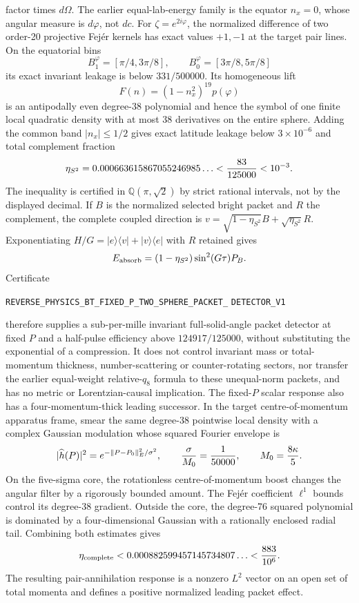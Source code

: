 \documentclass[11pt]{article}
\theoremstyle{definition}
\theoremstyle{remark}
\begin{document}
factor times $d\Omega$.  The earlier equal-lab-energy family is the equator
$n_x=0$, whose angular measure is $d\varphi$, not $dc$.  For
$\zeta=e^{2i\varphi}$, the normalized difference of two order-20 projective
Fej\'er kernels has exact values $+1,-1$ at the target pair lines.  On the
equatorial bins
\[
 B_1^\varphi=[\pi/4,3\pi/8],\qquad
 B_0^\varphi=[3\pi/8,5\pi/8]
\]
its exact invariant leakage is below $331/500000$.  Its homogeneous lift
\[
 F(n)=(1-n_x^2)^{19}p(\varphi)
\]
is an antipodally even degree-38 polynomial and hence the symbol of one finite
local quadratic density with at most 38 derivatives on the entire sphere.
Adding the common band $|n_x|\leq1/2$ gives exact latitude leakage below
$3\times10^{-6}$ and total complement fraction
\[
 \eta_{S^2}=0.000663615867055246985\ldots
 <{83\over125000}<10^{-3}.
\]
The inequality is certified in $\mathbb Q(\pi,\sqrt2)$ by strict rational
intervals, not by the displayed decimal.
If $B$ is the normalized selected bright packet and $R$ the complement, the
complete coupled direction is
$v=\sqrt{1-\eta_{S^2}}B+\sqrt{\eta_{S^2}}R$.  Exponentiating
$H/G=|e\rangle\langle v|+|v\rangle\langle e|$ with $R$ retained gives
\[
 E_{\rm absorb}=(1-\eta_{S^2})\sin^2(G\tau)P_B.
\]
Certificate
\par\noindent
\texttt{REVERSE\_PHYSICS\_BT\_FIXED\_P\_TWO\_SPHERE\_PACKET\_}
\allowbreak\texttt{DETECTOR\_V1}
\par\noindent
therefore supplies a sub-per-mille invariant full-solid-angle packet detector
at fixed $P$ and a half-pulse efficiency above $124917/125000$, without
substituting the exponential of a compression.  It does not control invariant
mass or total-momentum thickness, number-scattering or counter-rotating
sectors, nor transfer the earlier equal-weight relative-$q_8$ formula to these
unequal-norm packets, and has no metric or Lorentzian-causal implication.
The fixed-$P$ scalar response also has a four-momentum-thick leading
successor.  In the target centre-of-momentum apparatus frame, smear the same
degree-38 pointwise local density with a complex Gaussian modulation whose
squared Fourier envelope is
\[
 |\widehat h(P)|^2=e^{-\|P-P_0\|_E^2/\sigma^2},
 \qquad {\sigma\over M_0}={1\over50000},
 \qquad M_0={8\kappa\over5}.
\]
On the five-sigma core, the rotationless centre-of-momentum boost changes the
angular filter by a rigorously bounded amount.  The Fej\'er coefficient
$\ell^1$ bounds control its degree-38 gradient.  Outside the core, the
degree-76 squared polynomial is dominated by a four-dimensional Gaussian
with a rationally enclosed radial tail.  Combining both estimates gives
\[
 \eta_{\rm complete}
 <0.000882599457145734807\ldots
 <{883\over10^6}.
\]
The resulting pair-annihilation response is a nonzero $L^2$ vector on an open
set of total momenta and defines a positive normalized leading packet effect.
\end{document}
